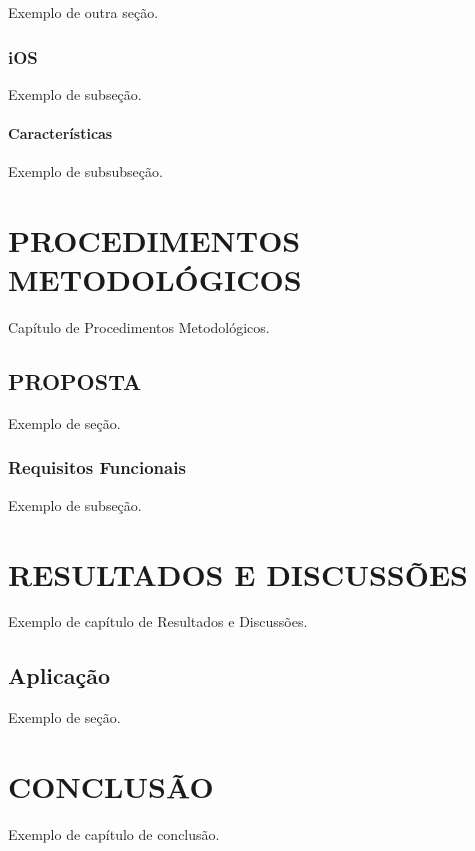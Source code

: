 \documentclass[
	12pt,				%
	openright,			%
	oneside,			%
	a4paper,			%
	chapter=TITLE,		%
	section=TITLE,		%
	english,			%
	french,				%
	spanish,			%
	brazil				%
	]{abntex2}
\begin{document}
	Exemplo de outra seção.
	
\subsection{iOS}
	
	Exemplo de subseção.


\subsubsection{Características}
	
	Exemplo de subsubseção.

\chapter{PROCEDIMENTOS METODOLÓGICOS}
	
	Capítulo de Procedimentos Metodológicos.

\section{PROPOSTA} %
	
	Exemplo de seção.

\subsection{Requisitos Funcionais}
	
	Exemplo de subseção.

\chapter{RESULTADOS E DISCUSSÕES}

	Exemplo de capítulo de Resultados e Discussões.
	
\section{Aplicação}

	Exemplo de seção.

\chapter{CONCLUSÃO}
	
	Exemplo de capítulo de conclusão.
\end{document}
